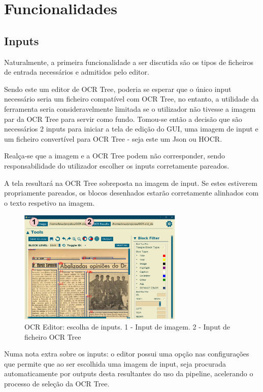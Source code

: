 \section{Funcionalidades}

\subsection{Inputs}

Naturalmente, a primeira funcionalidade a ser discutida são os tipos de ficheiros de entrada necessários e admitidos pelo editor.

Sendo este um editor de OCR Tree, poderia se esperar que o único input necessário seria um ficheiro compatível com OCR Tree, no entanto, a utilidade da ferramenta seria consideravelmente limitada se o utilizador não tivesse a imagem par da OCR Tree para servir como fundo. Tomou-se então a decisão que são necessários 2 inputs para iniciar a tela de edição do GUI, uma imagem de input e um ficheiro convertível para OCR Tree - seja este um Json ou HOCR.

Realça-se que a imagem e a OCR Tree podem não corresponder, sendo responsabilidade do utilizador escolher os inputs corretamente pareados. 

A tela resultará na OCR Tree sobreposta na imagem de input. Se estes estiverem propriamente pareados, os blocos desenhados estarão corretamente alinhados com o texto respetivo na imagem.


\begin{figure}[H]
	\centering
	\includegraphics[width=0.7\textwidth]{images/ilustracoes/ocr_editor_inputs.png}
	\caption{OCR Editor: escolha de inputs. 1 - Input de imagem. 2 - Input de ficheiro OCR Tree}
	\label{fig:ocr_editor_inputs}
\end{figure}



Numa nota extra sobre os inputs: o editor possui uma opção nas configurações que permite que ao ser escolhida uma imagem de input, seja procurada automaticamente por outputs desta resultantes do uso da pipeline, acelerando o processo de seleção da OCR Tree.


